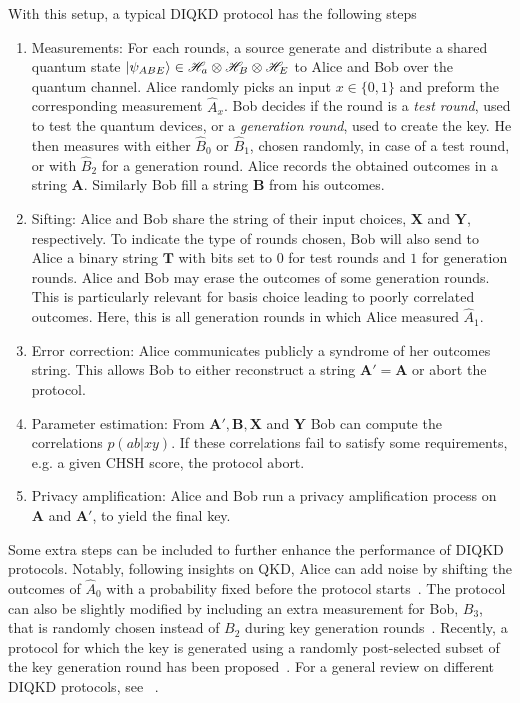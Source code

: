 With this setup, a typical DIQKD protocol has the following steps
\begin{enumerate}
	\item Measurements: For each rounds, a source generate and distribute a shared quantum state $\ket{\psi_{ABE}} \in \mathscr{H}_a \otimes \mathscr{H}_B \otimes \mathscr{H}_E$ to Alice and Bob over the quantum channel. Alice randomly picks an input $x\in\{0,1\}$ and preform the corresponding measurement $\hat{A}_x$. 
		Bob decides if the round is a \textit{test round}, used to test the quantum devices, or a \textit{generation round}, used to create the key.
		He then measures with either $\hat{B}_0$ or $\hat{B}_1$, chosen randomly, in case of a test round, or with $\hat{B}_2$ for a generation round. 
		Alice records the obtained outcomes in a string $\mathbf{A}$. 
		Similarly Bob fill a string $\mathbf{B}$ from his outcomes. 
	\item Sifting: 
		Alice and Bob share the string of their input choices, $\mathbf{X}$ and $\mathbf{Y}$, respectively.
		To indicate the type of rounds chosen, Bob will also send to Alice a binary string $\mathbf{T}$ with bits set to $0$ for test rounds and $1$ for generation rounds.  
		Alice and Bob may erase the outcomes of some generation rounds. 
		This is particularly relevant for basis choice leading to poorly correlated outcomes. 
		Here, this is all generation rounds in which Alice measured $\hat{A}_1$. 	
	\item Error correction: 
		Alice communicates publicly a syndrome of her outcomes string. 
		This allows Bob to either reconstruct a string $\mathbf{A'}=\mathbf{A}$ or abort the protocol.
	\item Parameter estimation:
		From $\mathbf{A'},\mathbf{B},\mathbf{X}$ and $\mathbf{Y}$ Bob can compute the correlations $p(ab|xy)$. 
		If these correlations fail to satisfy some requirements, e.g. a given CHSH score, the protocol abort. 
	\item Privacy amplification: 
		Alice and Bob run a privacy amplification process on $\mathbf{A}$ and $\mathbf{A'}$, to yield the final key.
\end{enumerate}

Some extra steps can be included to further enhance the performance of DIQKD protocols.
Notably, following insights on QKD, Alice can add noise by shifting the outcomes of $\hat{A}_0$ with a probability fixed before the protocol starts~\cite{Ho2020}. 
The protocol can also be slightly modified by including an extra measurement for Bob, $B_3$, that is randomly chosen instead of $B_2$ during key generation rounds~\cite{Schwonnek2021}. 
Recently, a protocol for which the key is generated using a randomly post-selected subset of the key generation round has been proposed~\cite{Xu2022}. For a general review on different DIQKD protocols, see ~\cite{Primaatmaja2023}.


